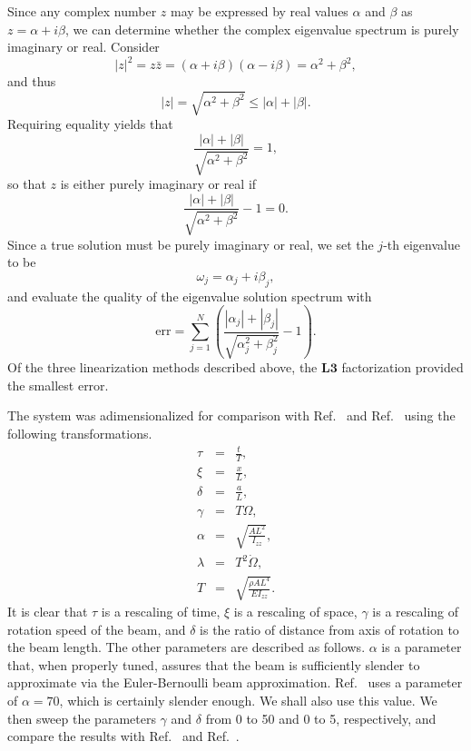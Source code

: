 Since any complex number $z$ may be expressed by real values $\alpha$ and $\beta$ as $z=\alpha+i\beta$, we can determine whether the complex eigenvalue spectrum is purely imaginary or real. Consider
\begin{equation}
|z|^2 = z\bar z = (\alpha+i\beta)(\alpha-i\beta) = \alpha^2+\beta^2,
\end{equation}
and thus
\begin{equation}
|z| = \sqrt{\alpha^2+\beta^2} \leq |\alpha|+|\beta|.
\end{equation}
Requiring equality yields that
\begin{equation}
\frac{|\alpha|+|\beta|}{\sqrt{\alpha^2+\beta^2}} = 1,
\end{equation}
so that $z$ is either purely imaginary or real if
\begin{equation}
\frac{|\alpha|+|\beta|}{\sqrt{\alpha^2+\beta^2}} - 1 = 0.
\end{equation}
Since a true solution must be purely imaginary or real, we set the $j$-th eigenvalue to be
\begin{equation}
\omega_j = \alpha_j+i\beta_j,
\end{equation}
and evaluate the quality of the eigenvalue solution spectrum with
\begin{equation}
\label{eq:eval_spec_err}
\text{err} = \sum_{j=1}^N \left(\frac{|\alpha_j|+|\beta_j|}{\sqrt{\alpha_j^2+\beta_j^2}} - 1\right).
\end{equation}
Of the three linearization methods described above, the $\mathbf{L3}$ factorization provided the smallest error. 

The system was adimensionalized for comparison with Ref.~\cite{chung2002dynamic} and Ref.~\cite{wright82vibration} using the following transformations.
\begin{eqnarray}
\tau &=& \frac{t}{T}, \\
\xi &=& \frac{x}{L}, \\
\delta &=& \frac{a}{L}, \\
\gamma &=& T\Omega,\\
\alpha &=& \sqrt{\frac{AL^2}{I_{zz}}}, \\
\lambda &=& T^2\dot\Omega, \\
T &=& \sqrt{\frac{\rho AL^4}{EI_{zz}}}.
\end{eqnarray}
It is clear that $\tau$ is a rescaling of time, $\xi$ is a rescaling of space, $\gamma$ is a rescaling of rotation speed of the beam, and $\delta$ is the ratio of distance from axis of rotation to the beam length. The other parameters are described as follows. $\alpha$ is a parameter that, when properly tuned, assures that the beam is sufficiently slender to approximate via the Euler-Bernoulli beam approximation. Ref.~\cite{chung2002dynamic} uses a parameter of $\alpha=70$, which is certainly slender enough. We shall also use this value. We then sweep the parameters $\gamma$ and $\delta$ from 0 to 50 and 0 to 5, respectively, and compare the results with Ref.~\cite{chung2002dynamic} and Ref.~\cite{wright82vibration}.

